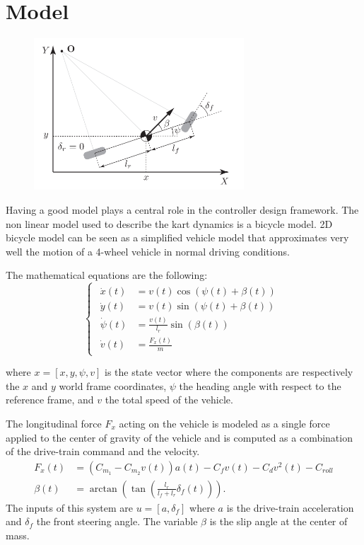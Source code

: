 \documentclass[a4paper,12pt,oneside]{book}
\begin{document}
\section{Model}
\begin{figure}[h!]
	\centering
	\includegraphics[width=0.7\textwidth]{Bycicle_scheme.png}
\label{Kinematic bicycle model of the vehicle}
\end{figure}
Having a good model plays a central role in the controller design framework.
The non linear model used to describe the kart dynamics is a bicycle model.
2D bicycle model can be seen as a simplified vehicle model that approximates very well the motion of a 4-wheel vehicle in normal driving conditions.

The mathematical equations are the following:
\begin{equation}
\begin{cases}
 	\begin{aligned}
		\dot{x}(t) &= v(t) \cos(\psi(t) + \beta(t)) \\
		\dot{y}(t) &= v(t) \sin(\psi(t) + \beta(t)) \\
		\dot{\psi}(t) &= \frac{v(t)}{l_r} \sin(\beta(t)) \\
		\dot{v}(t) &= \frac{F_x(t)}{m} 
	\end{aligned}
\end{cases}
\label{Plant}
\end{equation}

where $x = [x, y, \psi, v]$ is the state vector where the components are respectively the $x$ and $y$ world frame coordinates, $\psi$ the heading angle with respect to the reference frame, and $v$ the total speed of the vehicle.

The longitudinal force $F_x$ acting on the vehicle is modeled as a single force applied to the center of gravity of the vehicle and is computed as a combination of the drive-train command and the velocity. 
\begin{align}
    F_x (t) &= (C_{m_1} - C_{m_2} v(t)) a(t) - C_f v(t) - C_d v^2(t) - C_{roll} \label{eq:Long_force}\\
    \beta(t) &= \arctan\left(\tan\left(\frac{l_r}{l_f+l_r}\delta_f(t)\right) \right).
\end{align}
The inputs of this system are $u = [a, \delta_f]$ where $a$ is the drive-train acceleration and $\delta_f$ the front steering angle. 
The variable $\beta$ is the slip angle at the center of mass. 
\end{document}

